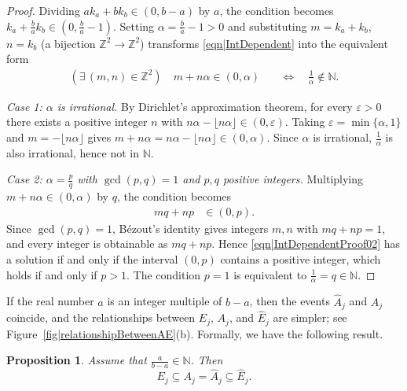 \documentclass[reqno]{amsart}
\newtheorem{proposition}{Proposition}
\begin{document}
\begin{proof}
Dividing $ak_a + bk_b \in (0, b-a)$ by $a$, the condition becomes 
$k_a + \frac{b}{a}k_b \in (0, \frac{b}{a}-1)$. Setting $\alpha = \frac{b}{a} - 1 > 0$ and substituting 
$m = k_a + k_b$, $n = k_b$ (a bijection $\mathbb{Z}^2 \to \mathbb{Z}^2$) 
transforms \eqref{eqn|IntDependent} into the equivalent form
\begin{align*} 
\left(\exists\,(m,n)\in\mathbb{Z}^2\right) \quad 
m + n\alpha \in (0,\alpha) 
\quad &\Longleftrightarrow \quad 
\frac{1}{\alpha} \notin \mathbb{N}. 
\end{align*}
 

\emph{Case 1: $\alpha$ is irrational.} By Dirichlet's approximation 
theorem, for every $\varepsilon > 0$ there exists a positive integer 
$n$ with $n\alpha - \lfloor n\alpha \rfloor \in (0, \varepsilon)$. 
Taking $\varepsilon = \min\{\alpha, 1\}$ and 
$m = -\lfloor n\alpha \rfloor$ gives 
$m + n\alpha = n\alpha - \lfloor n\alpha \rfloor \in (0, \alpha)$. 
Since $\alpha$ is irrational, $\frac{1}{\alpha}$ is also irrational, 
hence not in $\mathbb{N}$.


\emph{Case 2: $\alpha = \frac{p}{q}$ with $\gcd(p,q) = 1$ and $p, q$ 
positive integers.} Multiplying $m + n\alpha \in (0,\alpha)$ by $q$, the condition becomes
\begin{align} 
mq + np & \in (0, p). 
\label{eqn|IntDependentProof02}
\end{align}
Since $\gcd(p,q) = 1$, B\'ezout's identity gives integers $m, n$ 
with $mq + np = 1$, and every integer is obtainable as $mq + np$. 
Hence \eqref{eqn|IntDependentProof02} has a solution if and only 
if the interval $(0, p)$ contains a positive integer, which holds 
if and only if $p > 1$. The condition $p = 1$ is equivalent to 
$\frac{1}{\alpha} = q \in \mathbb{N}$.
\end{proof} 


  




If the real number $a$ is an integer multiple of $b-a$, then the events $\hat A_j$ and $A_j$ coincide, and the relationships between $E_j$, $A_j$, and $\hat E_j$ are simpler; see Figure~\ref{fig|relationshipBetweenAE}(b). Formally, we have the following result.

\begin{proposition}\label{thm|ABSpecial}
Assume that $\frac{a}{b-a}\in\mathbb N$. Then
\[
E_j \subseteq A_j = \hat A_j \subseteq \hat E_j.
\]
\end{proposition}
\end{document}

